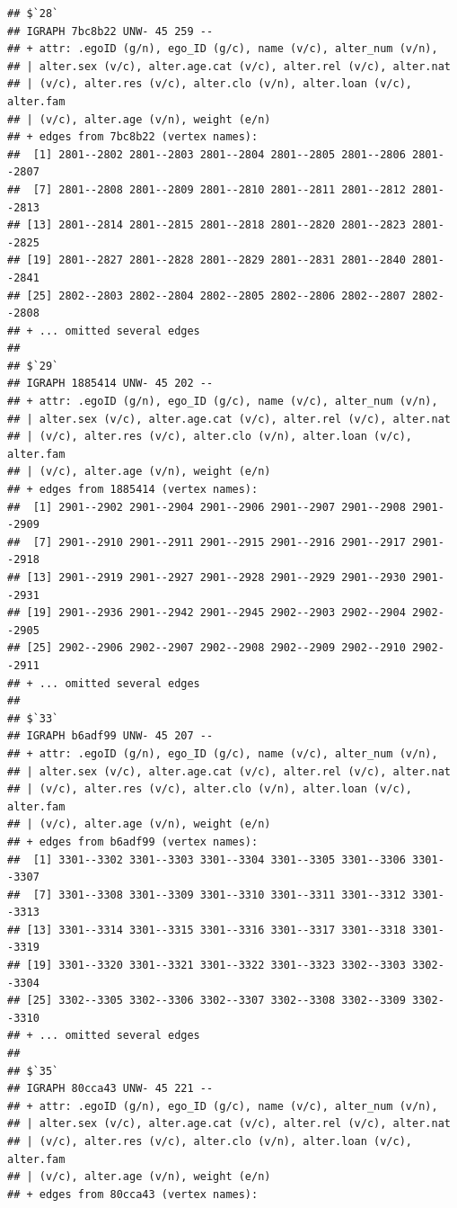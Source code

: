 \documentclass[
]{book}
\begin{document}
\begin{verbatim}
## $`28`
## IGRAPH 7bc8b22 UNW- 45 259 -- 
## + attr: .egoID (g/n), ego_ID (g/c), name (v/c), alter_num (v/n),
## | alter.sex (v/c), alter.age.cat (v/c), alter.rel (v/c), alter.nat
## | (v/c), alter.res (v/c), alter.clo (v/n), alter.loan (v/c), alter.fam
## | (v/c), alter.age (v/n), weight (e/n)
## + edges from 7bc8b22 (vertex names):
##  [1] 2801--2802 2801--2803 2801--2804 2801--2805 2801--2806 2801--2807
##  [7] 2801--2808 2801--2809 2801--2810 2801--2811 2801--2812 2801--2813
## [13] 2801--2814 2801--2815 2801--2818 2801--2820 2801--2823 2801--2825
## [19] 2801--2827 2801--2828 2801--2829 2801--2831 2801--2840 2801--2841
## [25] 2802--2803 2802--2804 2802--2805 2802--2806 2802--2807 2802--2808
## + ... omitted several edges
## 
## $`29`
## IGRAPH 1885414 UNW- 45 202 -- 
## + attr: .egoID (g/n), ego_ID (g/c), name (v/c), alter_num (v/n),
## | alter.sex (v/c), alter.age.cat (v/c), alter.rel (v/c), alter.nat
## | (v/c), alter.res (v/c), alter.clo (v/n), alter.loan (v/c), alter.fam
## | (v/c), alter.age (v/n), weight (e/n)
## + edges from 1885414 (vertex names):
##  [1] 2901--2902 2901--2904 2901--2906 2901--2907 2901--2908 2901--2909
##  [7] 2901--2910 2901--2911 2901--2915 2901--2916 2901--2917 2901--2918
## [13] 2901--2919 2901--2927 2901--2928 2901--2929 2901--2930 2901--2931
## [19] 2901--2936 2901--2942 2901--2945 2902--2903 2902--2904 2902--2905
## [25] 2902--2906 2902--2907 2902--2908 2902--2909 2902--2910 2902--2911
## + ... omitted several edges
## 
## $`33`
## IGRAPH b6adf99 UNW- 45 207 -- 
## + attr: .egoID (g/n), ego_ID (g/c), name (v/c), alter_num (v/n),
## | alter.sex (v/c), alter.age.cat (v/c), alter.rel (v/c), alter.nat
## | (v/c), alter.res (v/c), alter.clo (v/n), alter.loan (v/c), alter.fam
## | (v/c), alter.age (v/n), weight (e/n)
## + edges from b6adf99 (vertex names):
##  [1] 3301--3302 3301--3303 3301--3304 3301--3305 3301--3306 3301--3307
##  [7] 3301--3308 3301--3309 3301--3310 3301--3311 3301--3312 3301--3313
## [13] 3301--3314 3301--3315 3301--3316 3301--3317 3301--3318 3301--3319
## [19] 3301--3320 3301--3321 3301--3322 3301--3323 3302--3303 3302--3304
## [25] 3302--3305 3302--3306 3302--3307 3302--3308 3302--3309 3302--3310
## + ... omitted several edges
## 
## $`35`
## IGRAPH 80cca43 UNW- 45 221 -- 
## + attr: .egoID (g/n), ego_ID (g/c), name (v/c), alter_num (v/n),
## | alter.sex (v/c), alter.age.cat (v/c), alter.rel (v/c), alter.nat
## | (v/c), alter.res (v/c), alter.clo (v/n), alter.loan (v/c), alter.fam
## | (v/c), alter.age (v/n), weight (e/n)
## + edges from 80cca43 (vertex names):

\end{verbatim}
\end{document}
